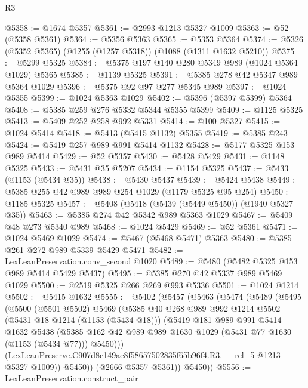 \begin{lexlean}{R3}
\begin{coremodule}
@5358 := @1674 @5357
@5361 := @2993 @1213 @5327 @1009
@5363 := @52 (@5358 @5361)
@5364 := @5356 @5363
@5365 := @5353 @5364
@5374 := @5326 (@5352 @5365) (@1255 (@1257 @5318)) (@1088 (@1311 @1632 @5210))
@5375 := @5299 @5325
@5384 := @5375 @197 @140 @280 @5349 @989 (@1024 @5364 @1029) @5365
@5385 := @1139 @5325
@5391 := @5385 @278 @42 @5347 @989 @5364 @1029
@5396 := @5375 @92 @97 @277 @5345 @989
@5397 := @1024 @5355
@5399 := @1024 @5363 @1029
@5402 := @5396 (@5397 @5399) @5364
@5408 := @5385 @259 @276 @5332 @5344 @5355 @5399
@5409 := @1125 @5325
@5413 := @5409 @252 @258 @992 @5331
@5414 := @100 @5327
@5415 := @1024 @5414
@5418 := @5413 (@5415 @1132) @5355
@5419 := @5385 @243
@5424 := @5419 @257 @989 @991 @5414 @1132
@5428 := @5177 @5325 @153 @989 @5414
@5429 := @52 @5357
@5430 := @5428 @5429
@5431 := @1148 @5325
@5433 := @5431 @35 @5207
@5434 := @1154 @5325
@5437 := @5433 (@1153 (@5434 @35))
@5438 := @5430 @5437
@5439 := @5424 @5438
@5449 := @5385 @255 @42 @989 @989 @254 @1029 (@1179 @5325 @95 @254)
@5450 := @1185 @5325
@5457 := @5408 (@5418 (@5439 (@5449 @5450)) (@1940 @5327 @35))
@5463 := @5385 @274 @42 @5342 @989 @5363 @1029
@5467 := @5409 @48 @273 @5340 @989
@5468 := @1024 @5429
@5469 := @52 @5361
@5471 := @1024 @5469 @1029
@5474 := @5467 (@5468 @5471) @5363
@5480 := @5385 @261 @272 @989 @5339 @5429 @5471
@5482 := LexLeanPreservation.conv_second @1020
@5489 := @5480 (@5482 @5325 @153 @989 @5414 @5429 @5437)
@5495 := @5385 @270 @42 @5337 @989 @5469 @1029
@5500 := @2519 @5325 @266 @269 @993 @5336
@5501 := @1024 @1214
@5502 := @5415 @1632
@5555 := @5402
    (@5457
      (@5463
        (@5474
          (@5489
            (@5495
              (@5500
                (@5501 @5502)
                @5469
                (@5385
                  @40
                  @268
                  @989
                  @992
                  @1214
                  @5502
                  (@5431 @18 @1214 (@1153 (@5434 @18)))
                  (@5419
                    @181
                    @989
                    @991
                    @5414
                    @1632
                    @5438
                    (@5385
                      @162
                      @42
                      @989
                      @989
                      @1630
                      @1029
                      (@5431 @77 @1630 (@1153 (@5434 @77)))
                      @5450)))
                (LexLeanPreserve.C907d8c149ae8f58657502835f65b96f4.R3.__rel_5 @1213 @5327 @1009))
              @5450))
          (@2666 @5357 @5361))
        @5450))
@5556 := LexLeanPreservation.construct_pair

\end{coremodule}
\end{lexlean}

